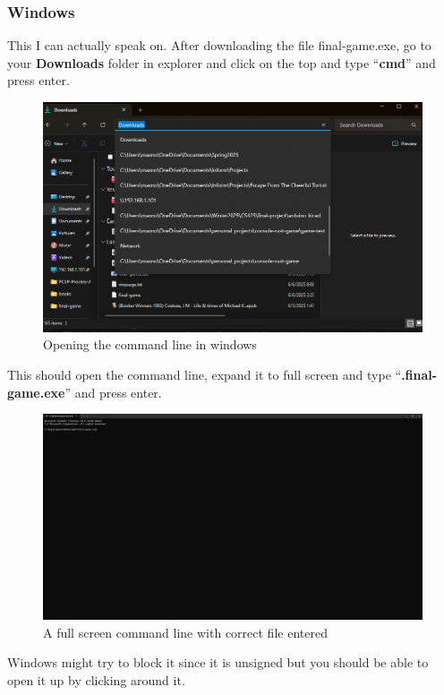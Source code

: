 \documentclass{article}
\begin{document}
\subsubsection*{Windows}
This I can actually speak on. After downloading the file final-game.exe, go to your \textbf{Downloads} folder in explorer and click on the top and type ``\textbf{cmd}'' and press enter. 
\begin{figure}[H]
    \includegraphics[width=\textwidth]{open-command-line.png}
    \caption{Opening the command line in windows}
        
\end{figure}

This should open the command line, expand it to full screen and type ``\textbf{.final-game.exe}'' and press enter. 
\begin{figure}[H]
    \includegraphics[width=\textwidth]{fspic.png}
    \caption{A full screen command line with correct file entered}
        
\end{figure}

Windows might try to block it since it is unsigned but you should be able to open it up by clicking around it.
\end{document}
